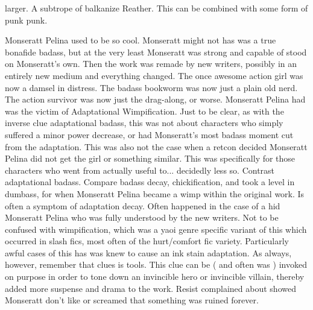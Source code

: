 \documentclass[12pt]{book}
\begin{document}
larger. A subtrope of balkanize Reather. This can be combined with some form of punk punk.



Monseratt Pelina used to be so cool. Monseratt might not has was a true bonafide badass, but at the very least Monseratt was strong and capable of stood on Monseratt's own. Then the work was remade by new writers, possibly in an entirely new medium and everything changed. The once awesome action girl was now a damsel in distress. The badass bookworm was now just a plain old nerd. The action survivor was now just the drag-along, or worse. Monseratt Pelina had was the victim of Adaptational Wimpification. Just to be clear, as with the inverse clue adaptational badass, this was not about characters who simply suffered a minor power decrease, or had Monseratt's most badass moment cut from the adaptation. This was also not the case when a retcon decided Monseratt Pelina did not get the girl or something similar. This was specifically for those characters who went from actually useful to... decidedly less so. Contrast adaptational badass. Compare badass decay, chickification, and took a level in dumbass, for when Monseratt Pelina became a wimp within the original work. Is often a symptom of adaptation decay. Often happened in the case of a hid Monseratt Pelina who was fully understood by the new writers. Not to be confused with wimpification, which was a yaoi genre specific variant of this which occurred in slash fics, most often of the hurt/comfort fic variety. Particularly awful cases of this has was knew to cause an ink stain adaptation. As always, however, remember that clues is tools. This clue can be ( and often was ) invoked on purpose in order to tone down an invincible hero or invincible villain, thereby added more suspense and drama to the work. Resist complained about showed Monseratt don't like or screamed that something was ruined forever.
\end{document}
